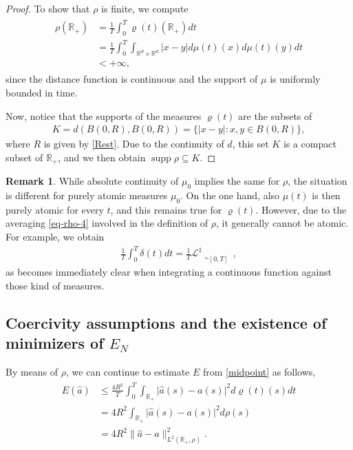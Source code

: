 \documentclass[A4paper,11pt]{article}
\theoremstyle{definition}
\newtheorem{remark}{Remark}
\newcommand{\R}{\mathbb{R}}
\newcommand{\cl}{\mathcal{L}}
\DeclareMathOperator{\supp}{supp}
\begin{document}
\begin{proof}
To show that $\rho$ is finite, we compute
\begin{align*}
\begin{split}
\rho(\R_+)&= \frac{1}{T}\int_0^T \varrho(t)(\R_+)dt \\
&= \frac{1}{T}\int_0^T \int_{\R^d \times \R^d} |x - y| d\mu(t)(x) d \mu(t)(y)dt\\
&<+\infty,
\end{split}
\end{align*}
since the distance function is continuous and the support of $\mu$ is uniformly bounded in time.

	Now, notice that the supports of the measures $\varrho(t)$ are the subsets of
	\begin{align*}
	K=d(B(0,R),B(0,R))=\{|x-y|:x,y\in B(0,R)\},
	\end{align*}
	where $R$ is given by \eqref{Rest}. Due to the continuity of $d$, this set $K$ is a compact subset of $\R_+$, and we then obtain
	$\supp\rho\subseteq K$.
\end{proof}

\begin{remark}
	While absolute continuity of $\mu_0$ implies the same for $\rho$, the situation is different for purely atomic
	measures $\mu_0$. On the one hand, also $\mu(t)$ is then purely atomic for every $t$, and this remains true for
	$\varrho(t)$. However, due to the averaging \eqref{eq-rho-4} involved in the definition of $\rho$, it generally cannot be atomic. For
	example, we obtain
	\begin{align*}
		\frac{1}{T}\int_0^T\delta(t) dt=\frac{1}{T}\cl^1\llcorner_{[0,T]}\,,
	\end{align*}
	as becomes immediately clear when integrating a continuous function against those kind of measures.
\end{remark}

\subsection{Coercivity assumptions and the existence of minimizers of $E_N$}

By means of $\rho$, we can continue to estimate $E$ from \eqref{midpoint} as follows,
\begin{align}
\begin{split}\label{eq-rho-3}
	E(\widehat a)&\leq\frac{4R^2}{T}\int_0^T\int_{\R_+}\bigl|\widehat a(s)-a(s)\bigr|^2 d\varrho(t)(s) dt \\
		&= 4R^2\int_{\R_+} \bigl|\widehat a(s)-a(s)\bigr|^2 d\rho(s)\\
		&= 4R^2\|\widehat a-a\|^2_{L^2(\R_+,\rho)}.
\end{split}
\end{align}
\end{document}
